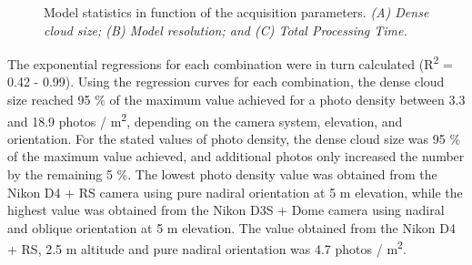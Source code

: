 \begin{figure}[ht]
	\caption[Model statistics in function of the acquisition parameters.]{Model statistics in function of the acquisition parameters. \textit{(A) Dense cloud size; (B) Model resolution; and (C) Total Processing Time.}}
	\label{figure2.4}
	
\end{figure}

The exponential regressions for each combination were in turn calculated (R\textsuperscript{2} = 0.42 - 0.99). Using the regression curves for each combination, the dense cloud size reached 95 \% of the maximum value achieved for a photo density between 3.3 and 18.9 photos / m\textsuperscript{2}, depending on the camera system, elevation, and orientation. For the stated values of photo density, the dense cloud size was 95 \% of the maximum value achieved, and additional photos only increased the number by the remaining 5 \%. The lowest photo density value was obtained from the Nikon D4 + RS camera using pure nadiral orientation at 5 m elevation, while the highest value was obtained from the Nikon D3S + Dome camera using nadiral and oblique orientation at 5 m elevation. The value obtained from the Nikon D4 + RS, 2.5 m altitude and pure nadiral orientation was 4.7 photos / m\textsuperscript{2}.

